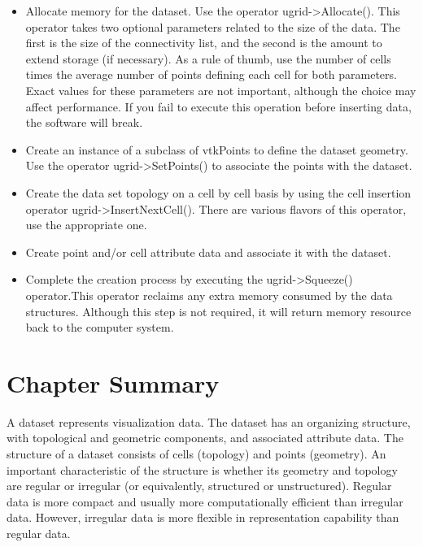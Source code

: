 \begin{itemize}

	\item Allocate memory for the dataset. Use the operator ugrid->Allocate(). This operator takes two optional parameters related to the size of the data. The first is the size of the connectivity list, and the second is the amount to extend storage (if necessary). As a rule of thumb, use the number of cells times the average number of points defining each cell for both parameters. Exact values for these parameters are not important, although the choice may affect performance. If you fail to execute this operation before inserting data, the software will break.

	\item Create an instance of a subclass of vtkPoints to define the dataset geometry. Use the operator ugrid->SetPoints() to associate the points with the dataset.

	\item Create the data set topology on a cell by cell basis by using the cell insertion operator ugrid->InsertNextCell(). There are various flavors of this operator, use the appropriate one.

	\item Create point and/or cell attribute data and associate it with the dataset.

	\item Complete the creation process by executing the ugrid->Squeeze() operator.This operator reclaims any extra memory consumed by the data structures. Although this step is not required, it will return memory resource back to the computer system.

\end{itemize}

\section{Chapter Summary}

A dataset represents visualization data. The dataset has an organizing structure, with topological and geometric components, and associated attribute data. The structure of a dataset consists of cells (topology) and points (geometry). An important characteristic of the structure is whether its geometry and topology are regular or irregular (or equivalently, structured or unstructured). Regular data is more compact and usually more computationally efficient than irregular data. However, irregular data is more flexible in representation capability than regular data.

